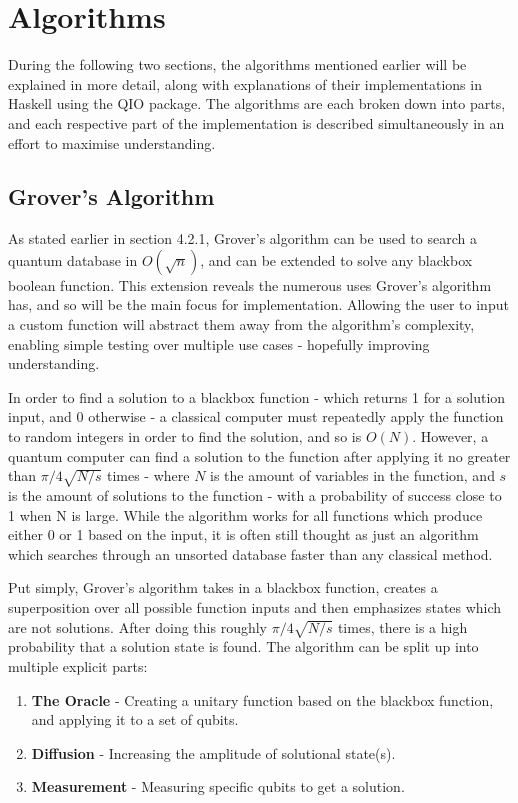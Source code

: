 \documentclass[a4paper,10pt, titlepage, twoside]{article}
\begin{document}
\section{Algorithms}
During the following two sections, the algorithms mentioned earlier will be explained in more detail, along with explanations of their implementations in Haskell using the QIO package. The algorithms are each broken down into parts, and each respective part of the implementation is described simultaneously in an effort to maximise understanding.

\subsection{Grover's Algorithm}
As stated earlier in section 4.2.1, Grover's algorithm can be used to search a quantum database in $O(\sqrt n)$, and can be extended to solve any blackbox boolean function. This extension reveals the numerous uses Grover's algorithm has, and so will be the main focus for implementation. Allowing the user to input a custom function will abstract them away from the algorithm's complexity, enabling simple testing over multiple use cases - hopefully improving understanding.\par
In order to find a solution to a blackbox function - which returns 1 for a solution input, and 0 otherwise - a classical computer must repeatedly apply the function to random integers in order to find the solution, and so is $O(N)$. However, a quantum computer can find a solution to the function after applying it no greater than $\pi/4\sqrt{N/s}$ times - where $N$ is the amount of variables in the function, and $s$ is the amount of solutions to the function - with a probability of success close to 1 when N is large. While the algorithm works for all functions which produce either 0 or 1 based on the input, it is often still thought as just an algorithm which searches through an unsorted database faster than any classical method.\par
Put simply, Grover's algorithm takes in a blackbox function, creates a superposition over all possible function inputs and then emphasizes states which are not solutions. After doing this roughly $\pi/4\sqrt{N/s}$ times, there is a high probability that a solution state is found. The algorithm can be split up into multiple explicit parts:
\begin{enumerate}
	\item \textbf{The Oracle} -  Creating a unitary function based on the blackbox function, and applying it to a set of qubits.
	\item \textbf{Diffusion} - Increasing the amplitude of solutional state(s).
	\item \textbf{Measurement} - Measuring specific qubits to get a solution.
\end{enumerate}
\par
\end{document}
